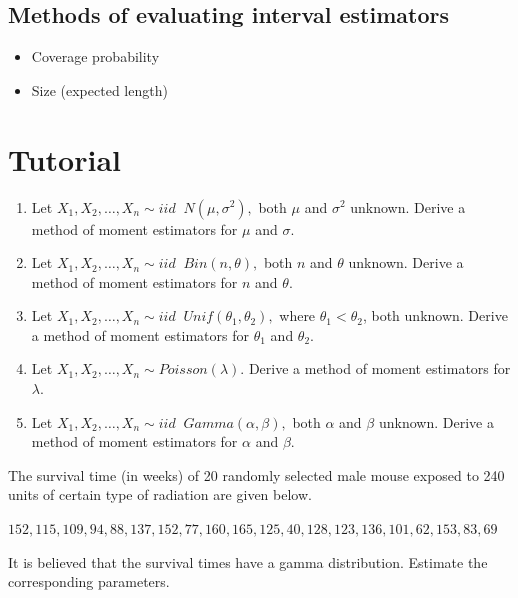 \documentclass[]{book}
\providecommand{\tightlist}{%
  \setlength{\itemsep}{0pt}\setlength{\parskip}{0pt}}
\begin{document}
\hypertarget{methods-of-evaluating-interval-estimators}{%
\subsection{Methods of evaluating interval estimators}\label{methods-of-evaluating-interval-estimators}}

\begin{itemize}
\tightlist
\item
  Coverage probability
\item
  Size (expected length)
  \newpage
\end{itemize}

\hypertarget{tutorial-1}{%
\section*{Tutorial}\label{tutorial-1}}

\begin{enumerate}
\def\labelenumi{\arabic{enumi}.}
\item
  Let \(X_1, X_2, \dots, X_n \sim iid\;\; N(\mu, \sigma^2),\) both \(\mu\) and \(\sigma^2\) unknown. Derive a method of moment estimators for \(\mu\) and \(\sigma\).
\item
  Let \(X_1, X_2, \dots, X_n \sim iid\;\; Bin(n,\theta),\) both \(n\) and \(\theta\) unknown. Derive a method of moment estimators for \(n\) and \(\theta\).
\item
  Let \(X_1, X_2, \dots, X_n \sim iid\;\; Unif(\theta_1,\theta_2),\) where \(\theta_1<\theta_2\), both unknown. Derive a method of moment estimators for \(\theta_1\) and \(\theta_2\).
\item
  Let \(X_1, X_2, \dots, X_n \sim Poisson(\lambda).\) Derive a method of moment estimators for \(\lambda\).
\item
  Let \(X_1, X_2, \dots, X_n \sim iid\;\; Gamma(\alpha,\beta),\) both \(\alpha\) and \(\beta\) unknown. Derive a method of moment estimators for \(\alpha\) and \(\beta\).
\end{enumerate}

The survival time (in weeks) of 20 randomly selected male mouse exposed to 240 units of certain type of radiation are given below.

\(152, 115, 109, 94, 88, 137, 152, 77, 160, 165, 125, 40, 128, 123, 136, 101, 62, 153, 83, 69\)

It is believed that the survival times have a gamma distribution. Estimate the corresponding parameters.
\end{document}

